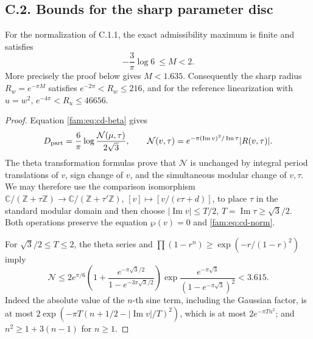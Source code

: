 \subsection{C.2. Bounds for the sharp parameter disc}
\begin{proposition}\label{fam:src:C.2.1}\label{fam:st:C.2.1}
For the normalization of C.1.1, the exact admissibility maximum is finite
and satisfies
\[
 -\frac3\pi\log6\ \leq M<2.
\]
More precisely the proof below gives \(M<1.635\). Consequently the sharp
radius \(R_w=e^{-\pi M}\) satisfies
\(e^{-2\pi}<R_w\leq216\), and for the reference linearization with
\(u=w^2\), \(e^{-4\pi}<R_u\leq46656\).
\end{proposition}
\begin{proof}
Equation \eqref{fam:eq:cd-beta} gives
\begin{equation}\label{fam:eq:cd-norm}
 D_{\rm part}=\frac6\pi\log\frac{\mathcal N(\mu,\tau)}{2\sqrt3},
 \qquad
 \mathcal N(v,\tau)=e^{-\pi(\operatorname{Im}v)^2/\operatorname{Im}\tau}
 |R(v,\tau)|.
\end{equation}
The theta transformation formulas prove that \(\mathcal N\) is unchanged
by integral period translations of \(v\), sign change of \(v\), and the
simultaneous modular change of \(v,\tau\). We may therefore use the
comparison isomorphism \(\mathbb C/(\mathbb Z+\tau\mathbb Z)\to
\mathbb C/(\mathbb Z+\tau'\mathbb Z)\), \([v]\mapsto[v/(c\tau+d)]\), to
place \(\tau\) in the standard modular domain and then choose
\(|\operatorname{Im}v|\leq T/2\), \(T=\operatorname{Im}\tau\geq\sqrt3/2\).
Both operations preserve the equation \(\wp(v)=0\) and \eqref{fam:eq:cd-norm}.

For \(\sqrt3/2\leq T\leq2\), the theta series and
\(\prod(1-r^n)\geq\exp(-r/(1-r)^2)\) imply
\[
 \mathcal N\leq
 2e^{\pi/6}\left(1+\frac{e^{-\pi\sqrt3/2}}
 {1-e^{-3\pi\sqrt3/2}}\right)
 \exp\frac{e^{-\pi\sqrt3}}{(1-e^{-\pi\sqrt3})^2}
 <3.615.
\]
Indeed the absolute value of the \(n\)-th sine term, including the
Gaussian factor, is at most
\(2\exp(-\pi T(n+1/2-|\operatorname{Im}v|/T)^2)\), which is at most
\(2e^{-\pi Tn^2}\); and \(n^2\geq1+3(n-1)\) for \(n\geq1\).


\end{proof}
